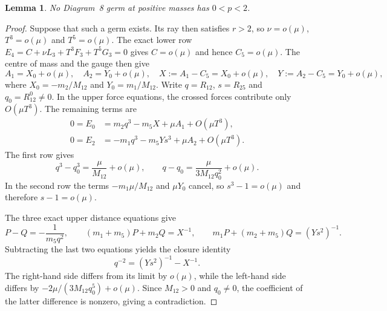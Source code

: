 \documentclass[11pt]{amsart}
\newtheorem{lemma}[theorem]{Lemma}
\theoremstyle{definition}
\theoremstyle{remark}
\begin{document}
{\begin{lemma}\label{lem:d8-order-six}
No Diagram~8 germ at positive masses has $0<p<2$.
\end{lemma}
\begin{proof}
Suppose that such a germ exists.  Its ray then satisfies $r>2$, so
$\nu=o(\mu)$, $T^3=o(\mu)$ and $T^5=o(\mu)$.
The exact lower row $E_4=C+\nu L_3+T^3F_3+T^5G_3=0$ gives
$C=o(\mu)$ and hence $C_5=o(\mu)$.
The centre of mass and the gauge then give
\[
A_1=X_0+o(\mu),\quad A_2=Y_0+o(\mu),\quad
X:=A_1-C_5=X_0+o(\mu),\quad Y:=A_2-C_5=Y_0+o(\mu),
\]
where $X_0=-m_2/M_{12}$ and $Y_0=m_1/M_{12}$.
Write $q=R_{12}$, $s=R_{25}$ and $q_0=R_{12}^0\ne0$.
In the upper force equations, the crossed forces contribute only
$O(\mu T^3)$.  The remaining terms are
\begin{align*}
0=E_0&=m_2q^3-m_5X+\mu A_1+O(\mu T^3),\\
0=E_2&=-m_1q^3-m_5Ys^3+\mu A_2+O(\mu T^3).
\end{align*}
The first row gives
\[
q^3-q_0^3=\frac{\mu}{M_{12}}+o(\mu),\qquad
q-q_0=\frac{\mu}{3M_{12}q_0^2}+o(\mu).
\]
In the second row the terms
$-m_1\mu/M_{12}$ and $\mu Y_0$ cancel, so
$s^3-1=o(\mu)$ and therefore $s-1=o(\mu)$.

The three exact upper distance equations give
\[
P-Q=-\frac1{m_5q^2},\qquad
(m_1+m_5)P+m_2Q=X^{-1},\qquad
m_1P+(m_2+m_5)Q=(Ys^2)^{-1}.
\]
Subtracting the last two equations yields the closure identity
\[
q^{-2}=(Ys^2)^{-1}-X^{-1}.
\]
The right-hand side differs from its limit by $o(\mu)$, while the left-hand side
differs by $-2\mu/(3M_{12}q_0^5)+o(\mu)$.  Since $M_{12}>0$ and $q_0\ne0$,
the coefficient of the latter difference is nonzero, giving a contradiction.
\end{proof}

}
\end{document}
